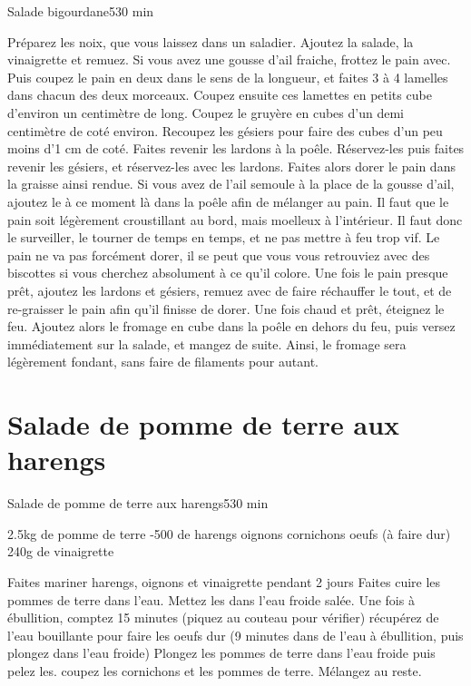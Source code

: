 {\begin{recette}{Salade bigourdane}{5}{30 min}{}
\begin{ingredients}
\end{ingredients}

\begin{preparation}
\etape Préparez les noix, que vous laissez dans un saladier. Ajoutez la salade, la vinaigrette et remuez.
\etape Si vous avez une gousse d'ail fraiche, frottez le pain avec. Puis coupez le pain en deux dans le sens de la longueur, et 
faites 3 à 4 lamelles dans chacun des deux morceaux. Coupez ensuite ces lamettes en petits cube d'environ un centimètre de long.
\etape Coupez le gruyère en cubes d'un demi centimètre de coté environ.
\etape Recoupez les gésiers pour faire des cubes d'un peu moins d'1 cm de coté.
\etape Faites revenir les lardons à la poêle. 
\etape Réservez-les puis faites revenir les gésiers, et réservez-les avec les lardons.
\etape Faites alors dorer le pain dans la graisse ainsi rendue. Si vous avez de l'ail semoule à la place de la gousse d'ail, 
ajoutez le à ce moment là dans la poêle afin de mélanger au pain. Il faut que le pain soit légèrement croustillant au bord, mais 
moelleux à l'intérieur. Il faut donc le surveiller, le tourner de temps en temps, et ne pas mettre à feu trop vif. Le pain ne va 
pas forcément dorer, il se peut que vous vous retrouviez avec des biscottes si vous cherchez absolument à ce qu'il colore. 
\etape Une fois le pain presque prêt, ajoutez les lardons et gésiers, remuez avec de faire réchauffer le tout, et de re-graisser 
le pain afin qu'il finisse de dorer. 
\etape Une fois chaud et prêt, éteignez le feu. Ajoutez alors le fromage en cube dans la poêle en dehors du feu, puis versez 
immédiatement sur la salade, et mangez de suite. Ainsi, le fromage sera légèrement fondant, sans faire de filaments pour autant.
\end{preparation}
\end{recette}

\section{Salade de pomme de terre aux harengs}
\begin{recette}{Salade de pomme de terre aux harengs}{5}{30 min}{}
\begin{ingredients}
\ingredient 2.5kg de pomme de terre
-500 de harengs
 oignons
 cornichons
 oeufs (à faire dur)
\ingredient 240g de vinaigrette
\end{ingredients}

\begin{preparation}
\etape Faites mariner harengs, oignons et vinaigrette pendant 2 jours
\etape Faites cuire les pommes de terre dans l'eau. Mettez les dans l'eau froide salée. Une fois à ébullition, comptez 15 minutes (piquez au couteau pour vérifier)
\etape récupérez de l'eau bouillante pour faire les oeufs dur (9 minutes dans de l'eau à ébullition, puis plongez dans l'eau froide)
\etape Plongez les pommes de terre dans l'eau froide puis pelez les.
\etape coupez les cornichons et les pommes de terre. Mélangez au reste.
\end{preparation}
\end{recette}

}
